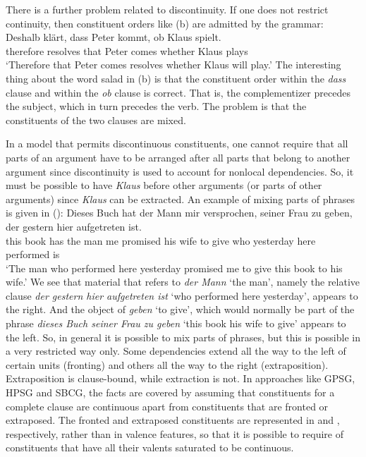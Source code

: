 There is a further problem related to discontinuity. If one does not restrict continuity, then
constituent orders like (b) are admitted by the grammar:
\eal
\ex
\gll Deshalb klärt, dass Peter kommt, ob Klaus spielt.\\
     therefore resolves that Peter comes whether Klaus plays\\
\glt `Therefore that Peter comes resolves whether Klaus will play.'
\zl
The interesting thing about the word salad in (b) is that the constituent order within the
\emph{dass} clause and within the \emph{ob} clause is correct. That is, the complementizer precedes
the subject, which in turn precedes the verb. The problem is that the constituents of the two
clauses are mixed. 

In a model that permits discontinuous constituents, one cannot require that all parts of an argument have
to be arranged after all parts that belong to another argument since discontinuity is used to
account for nonlocal dependencies. So, it must be possible to have \emph{Klaus} before other
arguments (or parts of other arguments) since \emph{Klaus} can be extracted. An example of mixing
parts of phrases is given in ():
\ea
\gll Dieses Buch hat der Mann mir versprochen, seiner Frau zu geben, der gestern hier aufgetreten ist.\\
     this   book has the man  me  promised     his    wife to give   who yesterday here performed is\\
\glt `The man who performed here yesterday promised me to give this book to his wife.'
\z 
We see that material that refers to \emph{der Mann} `the man', namely the relative clause \emph{der gestern
  hier aufgetreten ist} `who performed here yesterday', appears to the right. And the object of
\emph{geben} `to give', which would normally
be part of the phrase \emph{dieses Buch seiner Frau zu geben} `this book his wife to give' appears to the left. So, in general it
is possible to mix parts of phrases, but this is possible in a very restricted way only. Some
dependencies extend all the way to the left of certain units (fronting) and others all the way to the right
(extraposition). Extraposition is clause-bound, while extraction is not. In approaches like GPSG,
HPSG and SBCG, the facts are covered by assuming that constituents for a complete clause are
continuous apart from constituents that are fronted or extraposed. The fronted and extraposed
constituents are represented in \slasch and \extra \citep{Keller95b,Mueller99a}, respectively, rather than in valence features,
so that it is possible to require of constituents that have all their valents saturated to be
continuous.

